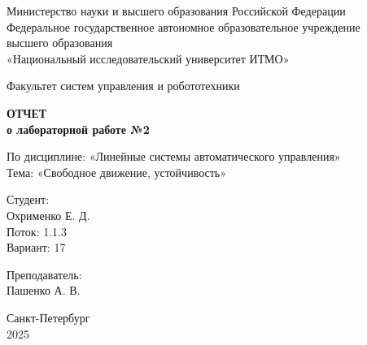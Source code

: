 \documentclass[a4paper,12pt]{article}
\begin{document}
	
	\begin{titlepage}
		\centering
		\vspace*{1cm}
		
		{\small
			Министерство науки и высшего образования Российской Федерации\\
			Федеральное государственное автономное образовательное учреждение\\
			высшего образования\\
			«Национальный исследовательский университет ИТМО»\\
		}
		
		\vspace{2cm}
		
		{\large
			Факультет систем управления и робототехники\\
		}
		
		\vspace{3cm}
		
		{\Huge\bfseries
			ОТЧЕТ\\
		}
		\vspace{0.5cm}
		{\LARGE\bfseries
			о лабораторной работе №2\\
		}
		
		\vspace{1cm}
		
		{\Large
			По дисциплине: «Линейные системы автоматического управления»\\
			\vspace{0.5cm}
			Тема: «Свободное движение, устойчивость»\\
		}
		
		\vspace{3cm}
		
		\begin{minipage}{0.4\textwidth}
			\raggedright
			{\large
				Студент:\\
			}
			Охрименко Е. Д.\\
			Поток: 1.1.3\\
			Вариант: 17\\
		\end{minipage}
		\hfill
		\begin{minipage}{0.4\textwidth}
			\raggedleft
			{\large
				Преподаватель:\\
			}
			Пашенко А. В.\\
		\end{minipage}
		
		\vfill
		
		{\large
			Санкт-Петербург\\
			2025\\
		}
		
	\end{titlepage}
	
\end{document}
